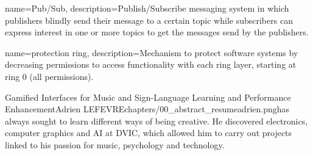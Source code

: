 



{
    name=Pub/Sub,
    description={Publish/Subscribe messaging system in which publishers blindly send their message to a certain topic while subscribers can express interest in one or more topics to get the messages send by the publishers.}
}

{
    name=protection ring,
    description={Mechanism to protect software systems by decreasing permissions to access functionality with each ring layer, starting at ring 0 (all permissions).}
}


\begin{thesis}{Gamified Interfaces for Music and Sign-Language Learning and Performance Enhancement}{Adrien LEFEVRE}{chapters/00_abstract_resume}{adrien.png}{has always sought to learn different ways of being creative. He discovered electronics, computer graphics and AI at DVIC, which allowed him to carry out projects linked to his passion for music, psychology and technology.}
    
    
    
    
    
\end{thesis}
